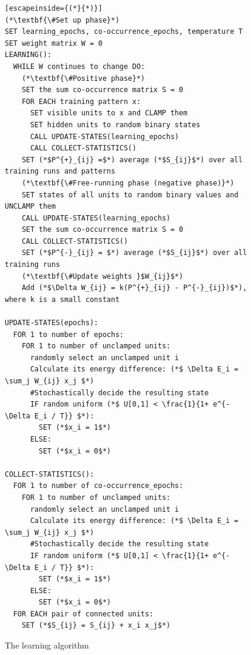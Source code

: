 \documentclass[12pt,twoside]{article}
\theoremstyle{plain}
\theoremstyle{definition}
\theoremstyle{remark}
\begin{document}
\begin{figure}[p]
\begin{lstlisting}[escapeinside={(*}{*)}]
(*\textbf{\#Set up phase}*)
SET learning_epochs, co-occurrence_epochs, temperature T
SET weight matrix W = 0
LEARNING():
  WHILE W continues to change DO:
    (*\textbf{\#Positive phase}*)
    SET the sum co-occurrence matrix S = 0
    FOR EACH training pattern x:
      SET visible units to x and CLAMP them
      SET hidden units to random binary states
      CALL UPDATE-STATES(learning_epochs)
      CALL COLLECT-STATISTICS()
    SET (*$P^{+}_{ij} =$*) average (*$S_{ij}$*) over all training runs and patterns
    (*\textbf{\#Free-running phase (negative phase)}*)
    SET states of all units to random binary values and UNCLAMP them
    CALL UPDATE-STATES(learning_epochs)
    SET the sum co-occurrence matrix S = 0
    CALL COLLECT-STATISTICS()
    SET (*$P^{-}_{ij} = $*) average (*$S_{ij}$*) over all training runs
    (*\textbf{\#Update weights }$W_{ij}$*)
    Add (*$\Delta W_{ij} = k(P^{+}_{ij} - P^{-}_{ij})$*), where k is a small constant

UPDATE-STATES(epochs):
  FOR 1 to number of epochs:
    FOR 1 to number of unclamped units:
      randomly select an unclamped unit i
      Calculate its energy difference: (*$ \Delta E_i = \sum_j W_{ij} x_j $*)
      #Stochastically decide the resulting state
      IF random uniform (*$ U[0,1] < \frac{1}{1+ e^{- \Delta E_i / T}} $*):
        SET (*$x_i = 1$*)
      ELSE:
        SET (*$x_i = 0$*)

COLLECT-STATISTICS():
  FOR 1 to number of co-occurrence_epochs:
    FOR 1 to number of unclamped units:
      randomly select an unclamped unit i
      Calculate its energy difference: (*$ \Delta E_i = \sum_j W_{ij} x_j $*)
      #Stochastically decide the resulting state
      IF random uniform (*$ U[0,1] < \frac{1}{1+ e^{- \Delta E_i / T}} $*):
        SET (*$x_i = 1$*)
      ELSE:
        SET (*$x_i = 0$*)
  FOR EACH pair of connected units:
    SET (*$S_{ij} = S_{ij} + x_i x_j$*)
\end{lstlisting}
\caption{The learning algorithm}
\label{fig:learning-alg}
\end{figure}
\end{document}
